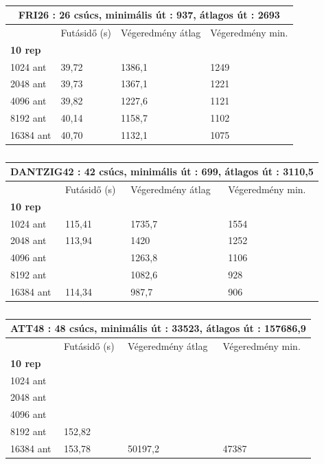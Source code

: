 \begin{table}[ht!]
	\centering
	\begin{tabular}{|p{2cm}||p{3cm}|p{3.5cm}|p{3.5cm}|}
		\hline
		\multicolumn{4}{|c|}{FRI26 : 26 csúcs, minimális út : 937, átlagos út : 2693} \\
		\hline
		& Futásidő (s) & Végeredmény átlag & Végeredmény min.\\
		\hline
		\textbf{10 rep} & & & \\
		1024 ant & 39,72 & 1386,1 & 1249\\
		2048 ant & 39,73 & 1367,1 & 1221\\
		4096 ant & 39,82 & 1227,6 & 1121\\
		8192 ant & 40,14 & 1158,7 & 1102\\
		16384 ant & 40,70 & 1132,1 & 1075\\
		\hline
	\end{tabular}
	\caption{}
	\label{table:TSPv1_26}
\end{table}

\begin{table}[ht!]
	\centering
	\begin{tabular}{|p{2cm}||p{3cm}|p{3.5cm}|p{3.5cm}|}
		\hline
		\multicolumn{4}{|c|}{DANTZIG42 : 42 csúcs, minimális út : 699, átlagos út : 3110,5} \\
		\hline
		& Futásidő (s) & Végeredmény átlag & Végeredmény min.\\
		\hline
		\textbf{10 rep} & & & \\
		1024 ant & 115,41 & 1735,7 & 1554\\
		2048 ant & 113,94 & 1420 & 1252\\
		4096 ant & & 1263,8 & 1106\\
		8192 ant & & 1082,6 & 928\\
		16384 ant & 114,34 & 987,7 & 906\\
		\hline
	\end{tabular}
	\caption{}
	\label{table:TSPv1_42}
\end{table}

%


\begin{table}[htbp!]
	\centering
	\begin{tabular}{|p{2cm}||p{3cm}|p{3.5cm}|p{3.5cm}|}
		\hline
		\multicolumn{4}{|c|}{ATT48 : 48 csúcs, minimális út : 33523, átlagos út : 157686,9} \\
		\hline
		& Futásidő (s) & Végeredmény átlag & Végeredmény min.\\
		\hline
		\textbf{10 rep} & & & \\
		1024 ant & & &\\
		2048 ant & & &\\
		4096 ant & & &\\
		8192 ant & 152,82 & &\\
		16384 ant & 153,78 & 50197,2 & 47387 \\
		\hline
	\end{tabular}
	\caption{}
	\label{table:TSPv1_48}
\end{table}

